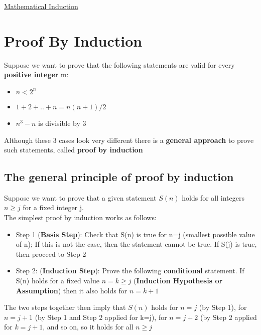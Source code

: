 \documentclass{article}[18pt]
\begin{document}
\begin{center}
\underline{\huge Mathematical Induction}
\end{center}
\section{Proof By Induction}
Suppose we want to prove that the following statements are valid for every \textbf{positive integer} m:
\begin{itemize}
\item $n<2^n$
\item $1+2+..+n=n(n+1)/2$
\item $n^3-n$ is divisible by 3
\end{itemize}
Although these 3 cases look very different there is a \textbf{general approach} to prove such statements, called \textbf{proof by induction}
\subsection{The general principle of proof by induction}
Suppose we want to prove that a given statement $S(n)$ holds for all integers $n \geqslant j$ for a fixed integer j.\\
The simplest proof by induction works as follows:
\begin{itemize}
\item Step 1 (\textbf{Basis Step}): Check that S(n) is true for n=j (smallest possible value of n); If this is not the case, then the statement cannot be true. If S(j) is true, then proceed to Step 2
\item Step 2: (\textbf{Induction Step}): Prove the following \textbf{conditional} statement. If S(n) holds for a fixed value $n=k\geqslant j$ (\textbf{Induction Hypothesis or Assumption}) then it also holds for $n=k+1$
\end{itemize}
The two steps together then imply that $S(n)$ holds for $n=j$ (by Step 1), for $n=j+1$ (by Step 1 and Step 2 applied for k=j), for $n=j+2$ (by Step 2 applied for $k=j+1$, and so on, so it holds for all $n\geqslant j$
\end{document}
